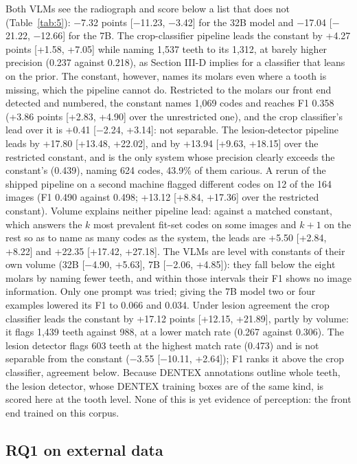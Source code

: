 \documentclass[conference]{IEEEtran}
\begin{document}
Both VLMs see the radiograph and score below a list that does not (Table~\ref{tab:5}): $-$7.32 points [$-$11.23, $-$3.42] for the 32B model and $-$17.04 [$-$21.22, $-$12.66] for the 7B. The crop-classifier pipeline leads the constant by +4.27 points [+1.58, +7.05] while naming 1,537 teeth to its 1,312, at barely higher precision (0.237 against 0.218), as Section III-D implies for a classifier that leans on the prior. The constant, however, names its molars even where a tooth is missing, which the pipeline cannot do. Restricted to the molars our front end detected and numbered, the constant names 1,069 codes and reaches F1 0.358 (+3.86 points [+2.83, +4.90] over the unrestricted one), and the crop classifier's lead over it is +0.41 [$-$2.24, +3.14]: not separable. The lesion-detector pipeline leads by +17.80 [+13.48, +22.02], and by +13.94 [+9.63, +18.15] over the restricted constant, and is the only system whose precision clearly exceeds the constant's (0.439), naming 624 codes, 43.9\% of them carious. A rerun of the shipped pipeline on a second machine flagged different codes on 12 of the 164 images (F1 0.490 against 0.498; +13.12 [+8.84, +17.36] over the restricted constant). Volume explains neither pipeline lead: against a matched constant, which answers the $k$ most prevalent fit-set codes on some images and $k+1$ on the rest so as to name as many codes as the system, the leads are +5.50 [+2.84, +8.22] and +22.35 [+17.42, +27.18]. The VLMs are level with constants of their own volume (32B [$-$4.90, +5.63], 7B [$-$2.06, +4.85]): they fall below the eight molars by naming fewer teeth, and within those intervals their F1 shows no image information. Only one prompt was tried; giving the 7B model two or four examples lowered its F1 to 0.066 and 0.034. Under lesion agreement the crop classifier leads the constant by +17.12 points [+12.15, +21.89], partly by volume: it flags 1,439 teeth against 988, at a lower match rate (0.267 against 0.306). The lesion detector flags 603 teeth at the highest match rate (0.473) and is not separable from the constant ($-$3.55 [$-$10.11, +2.64]); F1 ranks it above the crop classifier, agreement below. Because DENTEX annotations outline whole teeth, the lesion detector, whose DENTEX training boxes are of the same kind, is scored here at the tooth level. None of this is yet evidence of perception: the front end trained on this corpus.

\subsection{RQ1 on external data}
\end{document}

